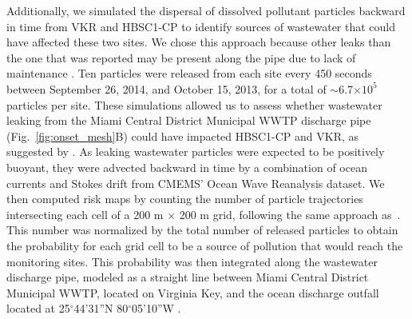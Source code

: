 \documentclass[preprint,12pt,authoryear]{elsarticle}
\begin{document}
Additionally, we simulated the dispersal of dissolved pollutant particles backward in time from VKR and HBSC1-CP to identify sources of wastewater that could have affected these two sites. We chose this approach because other leaks than the one that was reported may be present along the pipe due to lack of maintenance \citep{staletovich2017}. Ten particles were released from each site every 450 seconds between September 26, 2014, and October 15, 2013, for a total of $\sim$6.7$\times10^5$ particles per site. These simulations allowed us to assess whether wastewater leaking from the Miami Central District Municipal WWTP discharge pipe (Fig.~\ref{fig:onset_mesh}B) could have impacted HBSC1-CP and VKR, as suggested by \cite{gintert2019regional}. As leaking wastewater particles were expected to be positively buoyant, they were advected backward in time by a combination of ocean currents and Stokes drift from CMEMS' Ocean Wave Reanalysis dataset. We then computed risk maps by counting the number of particle trajectories intersecting each cell of a 200 m $\times$ 200 m grid, following the same approach as~\cite{anselain2023qatar}. This number was normalized by the total number of released particles to obtain the probability for each grid cell to be a source of pollution that would reach the monitoring sites.
This probability was then integrated along the wastewater discharge pipe, modeled as a straight line between Miami Central District Municipal WWTP, located on Virginia Key, and the ocean discharge outfall located at 25$^\circ$44'31''N 80$^\circ$05'10''W \citep{koopman2006ocean}.
\end{document}

